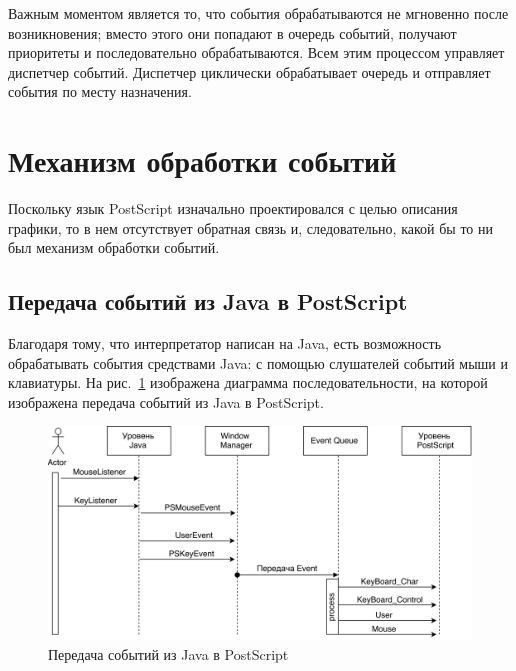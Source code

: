 Важным моментом является то, что события обрабатываются не мгновенно после возникновения; вместо этого они попадают в очередь событий, получают приоритеты и последовательно обрабатываются. Всем этим процессом управляет диспетчер событий. Диспетчер циклически обрабатывает очередь и отправляет события по месту назначения.%




 






\section{Механизм обработки событий}

Поскольку язык PostScript изначально проектировался с целью описания графики, то в нем отсутствует обратная связь и, следовательно, какой бы то ни был механизм обработки событий.

\subsection{Передача событий из Java в PostScript}

Благодаря тому, что интерпретатор написан на Java, есть возможность обрабатывать события средствами Java: с помощью слушателей событий мыши и клавиатуры. На рис.~\ref{eventpassing} изображена диаграмма последовательности, на которой изображена передача событий из Java в PostScript.

\begin{figure}[h!]
\centering
\includegraphics[width=\textwidth,keepaspectratio]{Makulov/Java_to_PostScript.png}
\caption{Передача событий из Java в PostScript}
\label{eventpassing}
\end{figure}

